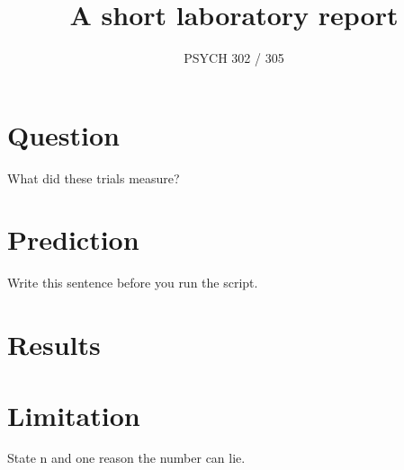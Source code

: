 \documentclass[11pt]{article}
\title{A short laboratory report}
\author{PSYCH 302 / 305}
\date{}
\begin{document}
\maketitle

\section{Question}
What did these trials measure?

\section{Prediction}
Write this sentence before you run the script.

\section{Results}


\section{Limitation}
State n and one reason the number can lie.
\end{document}
